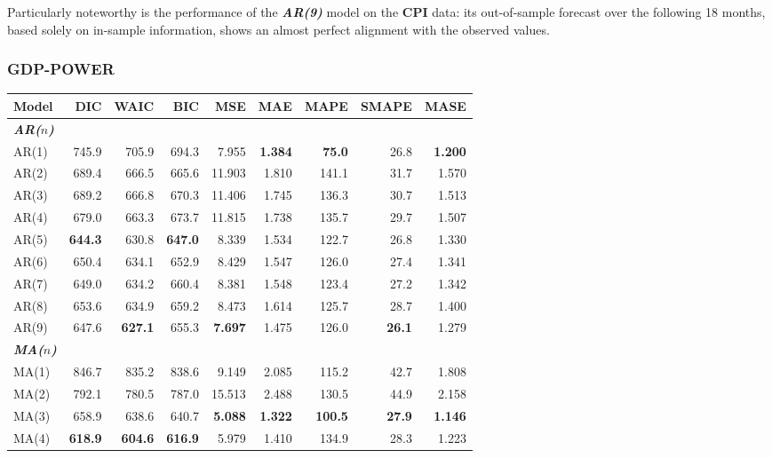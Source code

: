 \documentclass{Configuration_Files/PoliMi3i_thesis}
\begin{document}
Particularly noteworthy is the performance of the \textbf{\textit{AR(9)}} model on the \textbf{CPI} data: its out-of-sample forecast over the following 18 months, based solely on in-sample information, shows an almost perfect alignment with the observed values.

\subsubsection{GDP-POWER}
\begin{table}[H]
  \centering
  \small
  \begin{tabular}{@{}lrrrrrrrr@{}}
    \toprule
    \textbf{Model} & \textbf{DIC} & \textbf{WAIC} & \textbf{BIC} & \textbf{MSE} & \textbf{MAE} & \textbf{MAPE} & \textbf{SMAPE} & \textbf{MASE} \\
    \midrule
\textbf{\textit{AR($n$)}} \\
    AR(1)  & 745.9 & 705.9 & 694.3 & 7.955 & \textbf{1.384} & \textbf{75.0} & 26.8  & \textbf{1.200} \\
    AR(2)  & 689.4 & 666.5 & 665.6 & 11.903 & 1.810 & 141.1 & 31.7 & 1.570 \\
    AR(3)  & 689.2 & 666.8 & 670.3 & 11.406 & 1.745 & 136.3 & 30.7 & 1.513 \\
    AR(4)  & 679.0 & 663.3 & 673.7 & 11.815 & 1.738 & 135.7 & 29.7  & 1.507 \\
    AR(5)  & \textbf{644.3} & 630.8 & \textbf{647.0} & 8.339 & 1.534 & 122.7 & 26.8 & 1.330 \\
    AR(6)  & 650.4 & 634.1 & 652.9 & 8.429 & 1.547 & 126.0 & 27.4 & 1.341 \\
    AR(7)  & 649.0 & 634.2 & 660.4 & 8.381 & 1.548 & 123.4 & 27.2 & 1.342 \\
    AR(8)  & 653.6 & 634.9 & 659.2 & 8.473 & 1.614 & 125.7 & 28.7 & 1.400 \\
    AR(9)  & 647.6 & \textbf{627.1} & 655.3 & \textbf{7.697} & 1.475 & 126.0 & \textbf{26.1}  & 1.279 \\
    \midrule
\textbf{\textit{MA($n$)}} \\
    MA(1)  & 846.7 & 835.2 & 838.6 & 9.149  & 2.085 & 115.2 & 42.7 & 1.808 \\
    MA(2)  & 792.1 & 780.5 & 787.0 & 15.513 & 2.488 & 130.5 & 44.9 & 2.158 \\
    MA(3)  & 658.9 & 638.6 & 640.7 & \textbf{5.088}  & \textbf{1.322} & \textbf{100.5} & \textbf{27.9} & \textbf{1.146} \\
    MA(4)  & \textbf{618.9} & \textbf{604.6} & \textbf{616.9} & 5.979  & 1.410 & 134.9 & 28.3 & 1.223 \\

\end{tabular}
\end{table}
\end{document}
